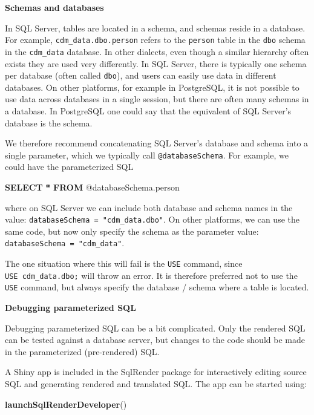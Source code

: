 \documentclass[11pt]{book}
\newenvironment{Shaded}{\begin{snugshade}}{\end{snugshade}}
\newcommand{\KeywordTok}[1]{\textcolor[rgb]{0.13,0.29,0.53}{\textbf{#1}}}
\newcommand{\NormalTok}[1]{#1}
\newcommand{\OperatorTok}[1]{\textcolor[rgb]{0.81,0.36,0.00}{\textbf{#1}}}
\theoremstyle{definition}
\theoremstyle{definition}
\theoremstyle{definition}
\theoremstyle{remark}
\begin{document}
\textbf{Schemas and databases}

In SQL Server, tables are located in a schema, and schemas reside in a database. For example, \texttt{cdm\_data.dbo.person} refers to the \texttt{person} table in the \texttt{dbo} schema in the \texttt{cdm\_data} database. In other dialects, even though a similar hierarchy often exists they are used very differently. In SQL Server, there is typically one schema per database (often called \texttt{dbo}), and users can easily use data in different databases. On other platforms, for example in PostgreSQL, it is not possible to use data across databases in a single session, but there are often many schemas in a database. In PostgreSQL one could say that the equivalent of SQL Server's database is the schema.

We therefore recommend concatenating SQL Server's database and schema into a single parameter, which we typically call \texttt{@databaseSchema}. For example, we could have the parameterized SQL

\begin{Shaded}
\begin{Highlighting}[]
\KeywordTok{SELECT} \OperatorTok{*} \KeywordTok{FROM}\NormalTok{ @databaseSchema.person}
\end{Highlighting}
\end{Shaded}

where on SQL Server we can include both database and schema names in the value: \texttt{databaseSchema\ =\ "cdm\_data.dbo"}. On other platforms, we can use the same code, but now only specify the schema as the parameter value: \texttt{databaseSchema\ =\ "cdm\_data"}.

The one situation where this will fail is the \texttt{USE} command, since \texttt{USE\ cdm\_data.dbo;} will throw an error. It is therefore preferred not to use the \texttt{USE} command, but always specify the database / schema where a table is located.

\textbf{Debugging parameterized SQL}

Debugging parameterized SQL can be a bit complicated. Only the rendered SQL can be tested against a database server, but changes to the code should be made in the parameterized (pre-rendered) SQL. 

A Shiny app is included in the SqlRender package for interactively editing source SQL and generating rendered and translated SQL. The app can be started using:

\begin{Shaded}
\begin{Highlighting}[]
\KeywordTok{launchSqlRenderDeveloper}\NormalTok{()}
\end{Highlighting}
\end{Shaded}
\end{document}
